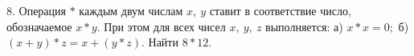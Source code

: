 8. Операция $*$ каждым двум числам $x,\ y$ ставит в соответствие число, обозначаемое $x*y.$ При этом для всех чисел $x,\ y,\ z$ выполняется: а) $x*x=0;$ б) $(x+y)*z=x+(y*z).$ Найти $8*12.$\\
